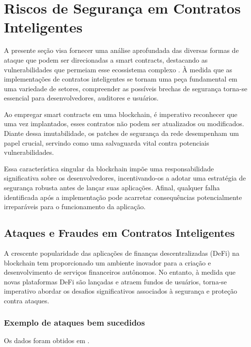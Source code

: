 
\chapter{\label{chap:chap3}Riscos de Segurança em Contratos Inteligentes}


A presente seção visa fornecer uma análise aprofundada das diversas formas de ataque que podem ser direcionadas a smart contracts, destacando as vulnerabilidades que permeiam esse ecossistema complexo \cite{SMAP}. À medida que as implementações de contratos inteligentes se tornam uma peça fundamental em uma variedade de setores, compreender as possíveis brechas de segurança torna-se essencial para desenvolvedores, auditores e usuários. 

 Ao empregar smart contracts em uma blockchain, é imperativo reconhecer que uma vez implantados, esses contratos não podem ser atualizados ou modificados. Diante dessa imutabilidade, os patches de segurança da rede desempenham um papel crucial, servindo como uma salvaguarda vital contra potenciais vulnerabilidades.

Essa característica singular da blockchain impõe uma responsabilidade significativa sobre os desenvolvedores, incentivando-os a adotar uma estratégia de segurança robusta antes de lançar suas aplicações. Afinal, qualquer falha identificada após a implementação pode acarretar consequências potencialmente irreparáveis para o funcionamento da aplicação.


\section{Ataques e Fraudes em Contratos Inteligentes}

A crescente popularidade das aplicações de finanças descentralizadas (DeFi) na blockchain tem proporcionado um ambiente inovador para a criação e desenvolvimento de serviços financeiros autônomos. No entanto, à medida que novas plataformas DeFi são lançadas e atraem fundos de usuários, torna-se imperativo abordar os desafios significativos associados à segurança e proteção contra ataques. 


\subsection{Exemplo de ataques bem sucedidos}
Os dados foram obtidos em \cite{RA}.

